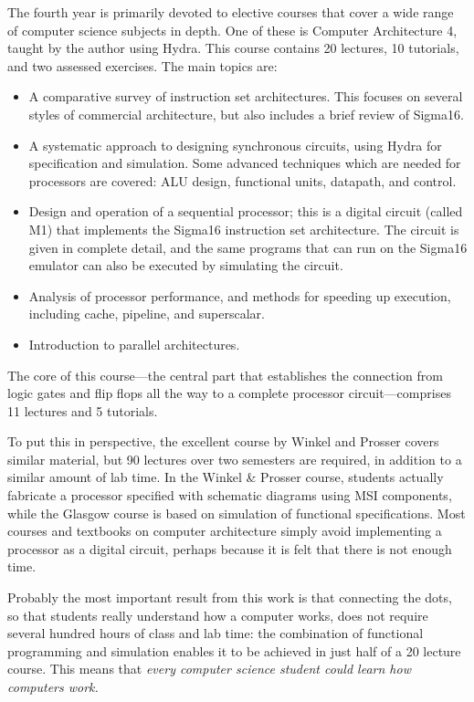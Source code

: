 \documentclass[submission,copyright,creativecommons]{eptcs}
\begin{document}
The fourth year is primarily devoted to elective courses that cover
a wide range of computer science subjects in depth.  One of these
is Computer Architecture 4, taught by the author using Hydra.  This
course contains 20 lectures, 10 tutorials, and two assessed
exercises.  The main topics are:
\begin{itemize}
\item A comparative survey of instruction set architectures.  This
  focuses on several styles of commercial architecture, but also
  includes a brief review of Sigma16.
\item A systematic approach to designing synchronous circuits,
  using Hydra for specification and simulation.  Some advanced
  techniques which are needed for processors are covered: ALU
  design, functional units, datapath, and control.
\item Design and operation of a sequential processor; this is a
  digital circuit (called M1) that implements the Sigma16
  instruction set architecture.  The circuit is given in complete
  detail, and the same programs that can run on the Sigma16
  emulator can also be executed by simulating the circuit.
\item Analysis of processor performance, and methods for speeding
  up execution, including cache, pipeline, and superscalar.
\item Introduction to parallel architectures.
\end{itemize}

The core of this course---the central part that establishes the
connection from logic gates and flip flops all the way to a
complete processor circuit---comprises 11 lectures and 5 tutorials.

To put this in perspective, the excellent course by Winkel and
Prosser \cite{WP1986-ArtDigDesign} covers similar material, but 90
lectures over two semesters are required, in addition to a similar
amount of lab time. In the Winkel \& Prosser course, students
actually fabricate a processor specified with schematic diagrams
using MSI components, while the Glasgow course is based on
simulation of functional specifications.  Most courses and
textbooks on computer architecture simply avoid implementing a
processor as a digital circuit, perhaps because it is felt that
there is not enough time.

Probably the most important result from this work is that
connecting the dots, so that students really understand how a
computer works, does not require several hundred hours of class and
lab time: the combination of functional programming and simulation
enables it to be achieved in just half of a 20 lecture course.
This means that \emph{every computer science student could learn
  how computers work.}
\end{document}
